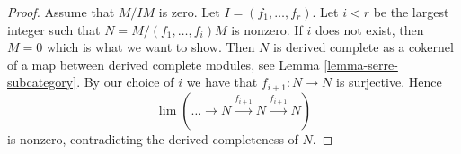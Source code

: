 \documentclass[10pt,a4paper]{amsart}
\theoremstyle{plain}
\theoremstyle{definition}
\theoremstyle{remark}
\numberwithin{equation}{subsection}
\def\lim{\mathop{\mathrm{lim}}\nolimits}
\begin{document}
\begin{proof}
Assume that $M/IM$ is zero. Let $I = (f_1, \ldots, f_r)$.
Let $i < r$ be the largest integer such that $N = M/(f_1, \ldots, f_i)M$
is nonzero. If $i$ does not exist, then $M = 0$ which is what we
want to show. Then $N$ is derived complete as a cokernel
of a map between derived complete modules, see
Lemma \ref{lemma-serre-subcategory}.
By our choice of $i$ we have that $f_{i + 1} : N \to N$ is surjective.
Hence
$$
\lim (\ldots \to N \xrightarrow{f_{i + 1}} N \xrightarrow{f_{i + 1}} N)
$$
is nonzero, contradicting the derived completeness of $N$.
\end{proof}
\end{document}
